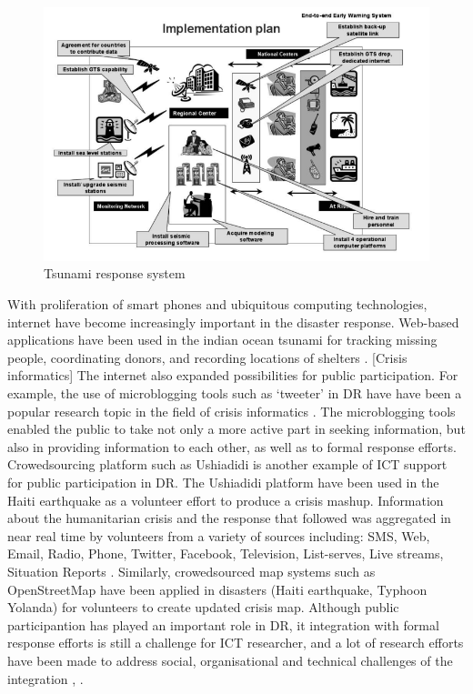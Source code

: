 \begin{figure}[h]
  \centering
  \includegraphics[width=1\textwidth]{img/background/ICTExample}
  \caption{Tsunami response system}
  \label{fig:ICTExample}
\end{figure}

With proliferation of smart phones and ubiquitous computing technologies, internet have become increasingly important in the disaster response. Web-based applications have been used in the indian ocean tsunami for tracking missing people, coordinating donors, and recording locations of shelters \cite{Wattegama2012}. [Crisis informatics] The internet also expanded possibilities for public participation. For example, the use of microblogging tools such as `tweeter' in DR have have been a popular research topic in the field of crisis informatics \cite{Kogan2012,Sarcevic2012,Starbird2010}.  The microblogging tools enabled the public to take not only a more active part in seeking information, but also in providing information to each other, as well as to formal response efforts. Crowedsourcing platform such as Ushiadidi is another example of ICT support for public participation in DR. The Ushiadidi platform have been used in the Haiti earthquake as a volunteer effort to produce a crisis mashup. Information about the humanitarian crisis and the response that followed was aggregated in near real time by volunteers from a variety of sources including: SMS, Web, Email, Radio, Phone, Twitter, Facebook, Television, List-serves, Live streams, Situation Reports \cite{Morrow2011}. Similarly, crowedsourced map systems such as OpenStreetMap \cite{Palen2015} have been applied in disasters (Haiti earthquake, Typhoon Yolanda) for volunteers to create updated crisis map. Although public participantion has played an important role in DR, it integration with formal response efforts is still a challenge for ICT researcher\cite{Palen2007}, and a lot of research efforts have been made to address social, organisational and technical challenges of the integration \cite{Dashti2014}, \cite{Sutton2008}.   \\

